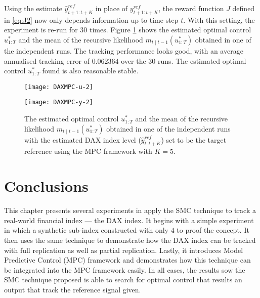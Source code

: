 Using the estimate $\hat{y}^{ref}_{t+1:t+K}$ in place of $y^{ref}_{t+1:t+K}$, the reward function $J$ defined in \eqref{eq:J2} now only depends information up to time step $t$. With this setting, the experiment is re-run for $30$ times. Figure \ref{fig:mpc2} shows the estimated optimal control $u^*_{1:T}$ and the mean of the recursive likelihood $m_{t \mid t-1}(u^*_{1:T})$ obtained in one of the independent runs. The tracking performance looks good, with an average annualised tracking error of $0.062364$ over the $30$ runs. The estimated optimal control $u^*_{1:T}$ found is also reasonable stable.

\begin{figure}[htbp]
\centering
    \begin{minipage}{0.5\textwidth}
        \centering
        \texttt{[image: DAXMPC-u-2]}
    \end{minipage}%
    \begin{minipage}{0.5\textwidth}
        \centering
        \texttt{[image: DAXMPC-y-2]}
    \end{minipage}
\caption{The estimated optimal control $u^*_{1:T}$ and the mean of the recursive likelihood $m_{t \mid t-1}(u^*_{1:T})$ obtained in one of the independent runs with the estimated DAX index level ($\hat{y}^{ref}_{t:t+K}$) set to be the target reference using the MPC framework with $K=5$.}
\label{fig:mpc2}
\end{figure}

\section{Conclusions}
\label{sec:conclusion5}
This chapter presents several experiments in apply the SMC technique to track a real-world financial index --- the DAX index.  It begins with a simple experiment in which a synthetic sub-index constructed with only $4$ to proof the concept. It then uses the same technique to demonstrate how the DAX index can be tracked with full replication as well as partial replication. Lastly, it introduces Model Predictive Control (MPC) framework and demonstrates how this technique can be integrated into the MPC framework easily. In all cases, the results sow the SMC technique proposed is able to search for optimal control that results an output that track the reference signal given.
